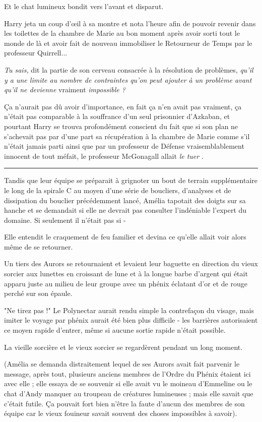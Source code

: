 Et le chat lumineux bondit vers l'avant et disparut.

Harry jeta un coup d'œil à sa montre et nota l'heure afin de pouvoir revenir dans les toilettes de la chambre de Marie au bon moment après avoir sorti tout le monde de là et avoir fait de nouveau immobiliser le Retourneur de Temps par le professeur Quirrell...

\emph{Tu sais,}  dit la partie de son cerveau consacrée à la résolution de problèmes, \emph{qu'il y a une limite au nombre de contraintes qu'on peut ajouter à un problème avant qu'il ne devienne } vraiment\emph{ impossible ?} 

Ça n'aurait pas dû avoir d'importance, en fait ça n'en avait pas vraiment, ça n'était pas comparable à la souffrance d'un seul prisonnier d'Azkaban, et pourtant Harry se trouva profondément conscient du fait que si son plan ne s'achevait pas par d'une part sa récupération à la chambre de Marie comme s'il n'était jamais parti ainsi que par un professeur de Défense vraisemblablement innocent de tout méfait, le professeur McGonagall allait \emph{le tuer} .
\par\noindent\rule{\textwidth}{0.4pt}
Tandis que leur équipe se préparait à grignoter un bout de terrain supplémentaire le long de la spirale C au moyen d'une série de boucliers, d'analyses et de dissipation du bouclier précédemment lancé, Amélia tapotait des doigts sur sa hanche et se demandait si elle ne devrait pas consulter l'indéniable l'expert du domaine. Si seulement il n'était pas si -

Elle entendit le craquement de feu familier et devina ce qu'elle allait voir alors même de se retourner.

Un tiers des Aurors se retournaient et levaient leur baguette en direction du vieux sorcier aux lunettes en croissant de lune et à la longue barbe d'argent qui était apparu juste au milieu de leur groupe avec un phénix éclatant d'or et de rouge perché sur son épaule.

"Ne tirez pas !" Le Polynectar aurait rendu simple la contrefaçon du visage, mais imiter le voyage par phénix aurait été bien plus difficile - les barrières autorisaient ce moyen rapide d'entrer, même si aucune sortie rapide n'était possible.

La vieille sorcière et le vieux sorcier se regardèrent pendant un long moment.

(Amélia se demanda distraitement lequel de ses Aurors avait fait parvenir le message, après tout, plusieurs anciens membres de l'Ordre du Phénix étaient ici avec elle ; elle essaya de se souvenir si elle avait vu le moineau d'Emmeline ou le chat d'Andy manquer au troupeau de créatures lumineuses ; mais elle savait que c'était futile. Ça pouvait fort bien n'être la faute d'aucun des membres de son équipe car le vieux fouineur savait souvent des choses impossibles à savoir).

